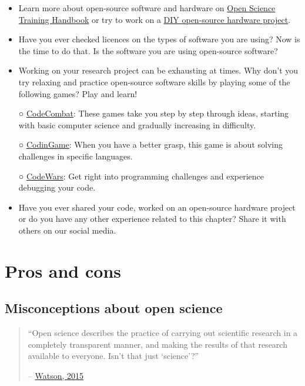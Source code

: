 \documentclass[
]{book}
\begin{document}
\begin{itemize}
\item
  Learn more about open-source software and hardware on \href{https://open-science-training-handbook.gitbook.io/book/open-science-basics/open-research-software-and-open-source}{Open Science Training Handbook} or try to work on a \href{https://en.wikipedia.org/wiki/List_of_open-source_hardware_projects}{DIY open-source hardware project}.
\item
  Have you ever checked licences on the types of software you are using? Now is the time to do that. Is the software you are using open-source software?
\item
  Working on your research project can be exhausting at times. Why don't you try relaxing and practice open-source software skills by playing some of the following games? Play and learn!

  ○ \href{https://codecombat.com/}{CodeCombat}: These games take you step by step through ideas, starting with basic computer science and gradually increasing in difficulty.

  ○ \href{https://www.codingame.com/start}{CodinGame}: When you have a better grasp, this game is about solving challenges in specific languages.

  ○ \href{https://www.codewars.com/}{CodeWars}: Get right into programming challenges and experience debugging your code.
\item
  Have you ever shared your code, worked on an open-source hardware project or do you have any other experience related to this chapter? Share it with others on our social media.
\end{itemize}

\hypertarget{pros-and-cons}{%
\chapter{Pros and cons}\label{pros-and-cons}}

\hypertarget{misconceptions-about-open-science}{%
\section{Misconceptions about open science}\label{misconceptions-about-open-science}}

\begin{quote}
``Open science describes the practice of carrying out scientific research in a completely transparent manner, and making the results of that research available to everyone. Isn't that just `science'?''

-- \href{https://genomebiology.biomedcentral.com/articles/10.1186/s13059-015-0669-2}{Watson, 2015}
\end{quote}
\end{document}
